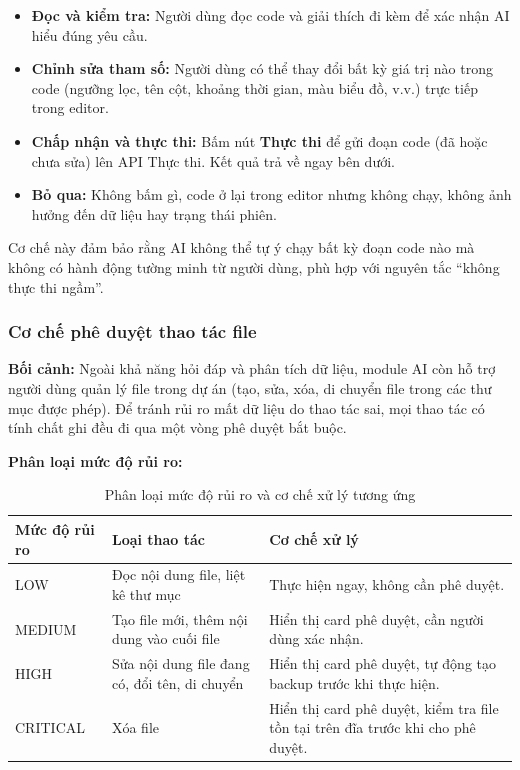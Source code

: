 \begin{itemize}
    \item \textbf{Đọc và kiểm tra:} Người dùng đọc code và giải thích đi kèm để xác nhận AI hiểu đúng yêu cầu.
    \item \textbf{Chỉnh sửa tham số:} Người dùng có thể thay đổi bất kỳ giá trị nào trong code (ngưỡng lọc, tên cột, khoảng thời gian, màu biểu đồ, v.v.) trực tiếp trong editor.
    \item \textbf{Chấp nhận và thực thi:} Bấm nút \textbf{Thực thi} để gửi đoạn code (đã hoặc chưa sửa) lên API Thực thi. Kết quả trả về ngay bên dưới.
    \item \textbf{Bỏ qua:} Không bấm gì, code ở lại trong editor nhưng không chạy, không ảnh hưởng đến dữ liệu hay trạng thái phiên.
\end{itemize}

Cơ chế này đảm bảo rằng AI không thể tự ý chạy bất kỳ đoạn code nào mà không có hành động tường minh từ người dùng, phù hợp với nguyên tắc ``không thực thi ngầm''.

\subsubsection{Cơ chế phê duyệt thao tác file}
\label{subsubsec:approval_workflow}

\noindent\textbf{Bối cảnh:}
Ngoài khả năng hỏi đáp và phân tích dữ liệu, module AI còn hỗ trợ người dùng quản lý file trong dự án (tạo, sửa, xóa, di chuyển file trong các thư mục được phép). Để tránh rủi ro mất dữ liệu do thao tác sai, mọi thao tác có tính chất ghi đều đi qua một vòng phê duyệt bắt buộc.

\noindent\textbf{Phân loại mức độ rủi ro:}

\begin{table}[H]
\centering
\small
\begin{tabularx}{\textwidth}{L{2.4cm} L{4.5cm} Y}
\textbf{Mức độ rủi ro} & \textbf{Loại thao tác} & \textbf{Cơ chế xử lý} \\ \hline
LOW & Đọc nội dung file, liệt kê thư mục & Thực hiện ngay, không cần phê duyệt. \\
MEDIUM & Tạo file mới, thêm nội dung vào cuối file & Hiển thị card phê duyệt, cần người dùng xác nhận. \\
HIGH & Sửa nội dung file đang có, đổi tên, di chuyển & Hiển thị card phê duyệt, tự động tạo backup trước khi thực hiện. \\
CRITICAL & Xóa file & Hiển thị card phê duyệt, kiểm tra file tồn tại trên đĩa trước khi cho phê duyệt. \\
\end{tabularx}
\caption{Phân loại mức độ rủi ro và cơ chế xử lý tương ứng}
\label{tab:risk_level}
\end{table}

